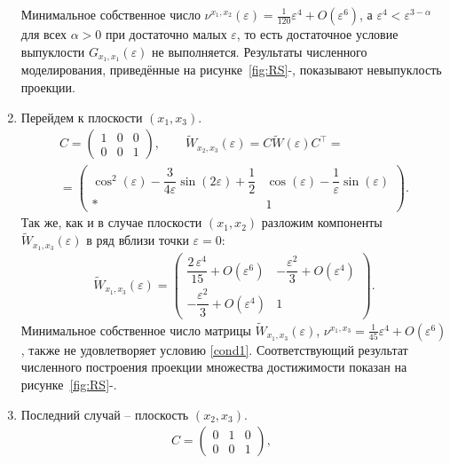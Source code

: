 \documentclass[../main.tex]{subfiles}
\begin{document}
\begin{enumerate}
		Минимальное собственное число $ \nu^{x_1,x_2}(\varepsilon) = \frac{1}{120}\varepsilon^4 + O(\varepsilon^6)$, а $ \varepsilon^4 < \varepsilon^{3-\alpha} $ для всех $ \alpha > 0 $ при достаточно малых $ \varepsilon $, то есть достаточное условие выпуклости $ G_{x_1, x_1}(\varepsilon) $ не выполняется. Результаты численного моделирования, приведённые на рисунке~\ref{fig:RS}-, показывают невыпуклость проекции. 
		\item Перейдем к плоскости $ (x_1,x_3) $. 
		\begin{gather*}
			C = \begin{pmatrix}
				1 & 0 & 0 \\
				0 & 0 & 1
			\end{pmatrix}, \qquad
			\widetilde{W}_{x_2,x_3}(\varepsilon) =  C \widetilde{W} (\varepsilon) C^{\top}  = \\ =\begin{pmatrix}
				\cos^2(\varepsilon)-\dfrac{3}{4\varepsilon}\sin(2\varepsilon)+\dfrac{1}{2} & 
				\cos\left(\varepsilon \right)-\dfrac{1}{\varepsilon} \sin\left(\varepsilon \right) \\ 
				* & 1
			\end{pmatrix}.
		\end{gather*}
		Так же, как и в случае плоскости $ (x_1,x_2) $ разложим компоненты $ 	\widetilde{W}_{x_1,x_3}(\varepsilon)  $ в ряд вблизи точки $ \varepsilon = 0 $:
		\begin{gather*}
			\widetilde{W}_{x_1,x_3}(\varepsilon) = \begin{pmatrix} 
				\dfrac{2\,\varepsilon ^4}{15} + O(\varepsilon^6) &
				-\dfrac{\varepsilon^2}{3}+ O(\varepsilon ^4)\\[8pt]
				-\dfrac{\varepsilon^2}{3} + O(\varepsilon^4) & 1 \end{pmatrix}.
		\end{gather*}
		Минимальное собственное число матрицы $  \widetilde{W}_{x_1,x_3}(\varepsilon)  $, $ \nu^{x_1,x_3} =   \frac{1}{45}\varepsilon^4 + O(\varepsilon^6) $, также не удовлетворяет условию \eqref{cond1}. Соответствующий результат численного построения проекции множества достижимости показан на рисунке~\ref{fig:RS}-.
		\item Последний случай -- плоскость $ (x_2,x_3) $.
		\begin{gather*}
			C = \begin{pmatrix}
				0 & 1 & 0 \\
				0 & 0 & 1
			\end{pmatrix}, \qquad

\end{gather*}
\end{enumerate}
\end{document}
